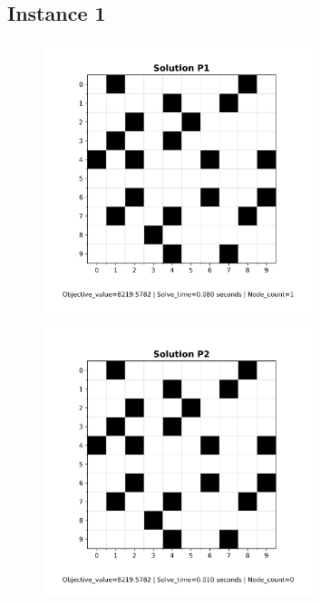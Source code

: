 \documentclass[a4paper,11pt]{article}
\begin{document}
\subsection{Instance 1}
\begin{figure}[H]
  \centering
  \includegraphics[width=0.7\textwidth]{figs/P1_solution_instance1.png}
\end{figure}
\begin{figure}[H]
  \centering
  \includegraphics[width=0.7\textwidth]{figs/P2_solution_instance1.png}
\end{figure}
\end{document}

